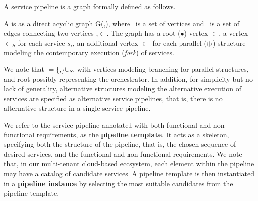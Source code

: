 A service pipeline is a graph formally defined as follows. %
\begin{definition}[\pipeline]\label{def:pipeline}
  A \pipeline is as a direct acyclic graph G(\V,\E), where \V\ is a set of vertices and \E\ is a set of edges connecting two vertices ,$\in$\V.
  The graph has a root ($\bullet$) vertex $\in$\V , a vertex $\in$\V$_S$ for each service $s_i$, an additional vertex $\in$\V\ for each parallel ($\oplus$) structure modeling the contemporary execution (\emph{fork}) of services.
\end{definition}

We note that \V$=$\{,\}$\cup$\V$_S$, with vertices  modeling branching for parallel structures, and root  possibly representing the orchestrator. In addition, for simplicity but no lack of generality, alternative structures modeling the alternative execution of services are specified as alternative service pipelines, that is, there is no alternative structure in a single service pipeline.

We refer to the service pipeline annotated with both functional and non-functional requirements, as the \textbf{pipeline template}. It acts as a skeleton, specifying both the structure of the pipeline, that is, the chosen sequence of desired services, and the functional and non-functional requirements. We note that, in our multi-tenant cloud-based ecosystem, each element within the pipeline may have a catalog of candidate services. A pipeline template is then instantiated in a \textbf{pipeline instance} by selecting the most suitable candidates from the pipeline template.

